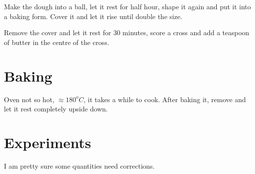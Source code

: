 Make the dough into a ball, let it rest for half hour, shape it again and put it into a baking form. Cover it and let it rise until double the size.

Remove the cover and let it rest for $30$ minutes, score a cross and add a teaspoon of butter in the centre of the cross.

\section{Baking}

Oven not so hot, $\approx180^oC$, it takes a while to cook.
%
After baking it, remove and let it rest completely upside down.
  
\section{Experiments}

I am pretty sure some quantities need corrections.

